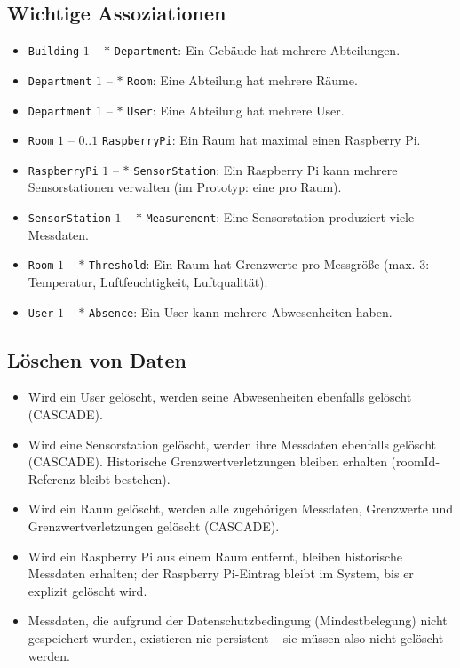 \documentclass[12pt,a4paper]{article}
\begin{document}
\subsection{Wichtige Assoziationen}
\begin{itemize}
	\item \texttt{Building} $1$ -- $*$ \texttt{Department}: Ein Gebäude hat mehrere Abteilungen.
	\item \texttt{Department} $1$ -- $*$ \texttt{Room}: Eine Abteilung hat mehrere Räume.
	\item \texttt{Department} $1$ -- $*$ \texttt{User}: Eine Abteilung hat mehrere User.
	\item \texttt{Room} $1$ -- $0..1$ \texttt{RaspberryPi}: Ein Raum hat maximal einen Raspberry Pi.
	\item \texttt{RaspberryPi} $1$ -- $*$ \texttt{SensorStation}: Ein Raspberry Pi kann mehrere Sensorstationen verwalten (im Prototyp: eine pro Raum).
	\item \texttt{SensorStation} $1$ -- $*$ \texttt{Measurement}: Eine Sensorstation produziert viele Messdaten.
	\item \texttt{Room} $1$ -- $*$ \texttt{Threshold}: Ein Raum hat Grenzwerte pro Messgröße (max. 3: Temperatur, Luftfeuchtigkeit, Luftqualität).
	\item \texttt{User} $1$ -- $*$ \texttt{Absence}: Ein User kann mehrere Abwesenheiten haben.
\end{itemize}

\subsection{Löschen von Daten}
\begin{itemize}
	\item Wird ein User gelöscht, werden seine Abwesenheiten ebenfalls gelöscht (CASCADE).
	\item Wird eine Sensorstation gelöscht, werden ihre Messdaten ebenfalls gelöscht (CASCADE). Historische Grenzwertverletzungen bleiben erhalten (roomId-Referenz bleibt bestehen).
	\item Wird ein Raum gelöscht, werden alle zugehörigen Messdaten, Grenzwerte und Grenzwertverletzungen gelöscht (CASCADE).
	\item Wird ein Raspberry Pi aus einem Raum entfernt, bleiben historische Messdaten erhalten; der Raspberry Pi-Eintrag bleibt im System, bis er explizit gelöscht wird.
	\item Messdaten, die aufgrund der Datenschutzbedingung (Mindestbelegung) nicht gespeichert wurden, existieren nie persistent -- sie müssen also nicht gelöscht werden.
\end{itemize}
\end{document}
